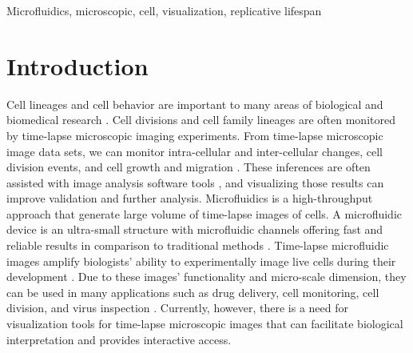 \documentclass[conference]{IEEEtran}
\begin{document}
\begin{IEEEkeywords}
Microfluidics, microscopic, cell, visualization, replicative lifespan 
\end{IEEEkeywords}

\section{Introduction}

Cell lineages and cell behavior are important to many areas of biological and biomedical research \cite{r1,r2,r3}. Cell divisions and cell family lineages are often monitored by time-lapse microscopic imaging experiments.  
From time-lapse microscopic image data sets, we can monitor intra-cellular and inter-cellular changes, cell division events, and cell growth and migration \cite{r4}. These inferences are often assisted with image analysis software tools \cite{r5,r6,r7}, and visualizing those results can improve validation and further analysis.
Microfluidics is a high-throughput approach that generate large volume of time-lapse images of cells. A microfluidic device is an ultra-small structure with microfluidic channels offering fast and reliable results in comparison to traditional methods \cite {r8,r9}. Time-lapse microfluidic images amplify biologists' ability to experimentally image live cells during their development \cite{r10}. Due to these images' functionality and micro-scale dimension, they can be used in many applications such as drug delivery, cell monitoring, cell division, and virus inspection \cite{r11,r12}. Currently, however, there is a need for visualization tools for time-lapse microscopic images that can facilitate biological interpretation and provides interactive access.  
\end{document}
